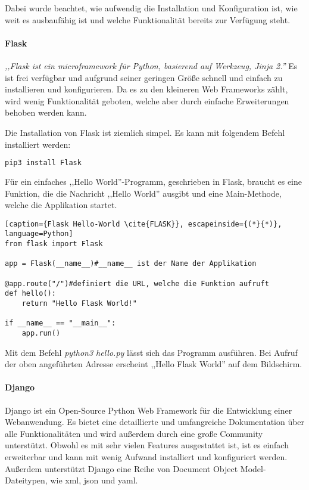 Dabei wurde beachtet, wie aufwendig die Installation und Konfiguration ist, wie weit es ausbaufähig ist und welche Funktionalität bereits zur Verfügung steht.

\paragraph{Flask}
\textit{,,Flask ist ein microframework für Python, basierend auf Werkzeug, Jinja 2.''}\cite{FLASK} Es ist frei verfügbar und aufgrund seiner geringen Größe schnell und einfach zu installieren und konfigurieren. Da es zu den kleineren Web Frameworks zählt, wird wenig Funktionalität geboten, welche aber durch einfache Erweiterungen behoben werden kann.\cite{FLASK}

Die Installation von Flask ist ziemlich simpel. Es kann mit folgendem Befehl installiert werden:
\begin{lstlisting}[caption={Installation von Flask \cite{FLASK}}, language=bash]
pip3 install Flask
\end{lstlisting}

Für ein einfaches ,,Hello World''-Programm, geschrieben in Flask, braucht es eine Funktion, die die Nachricht ,,Hello World'' ausgibt und eine Main-Methode, welche die Applikation startet.

\begin{lstlisting}[caption={Flask Hello-World \cite{FLASK}}, escapeinside={(*}{*)}, language=Python]
from flask import Flask

app = Flask(__name__)#__name__ ist der Name der Applikation

@app.route("/")#definiert die URL, welche die Funktion aufruft
def hello():
	return "Hello Flask World!"

if __name__ == "__main__":
    app.run()
\end{lstlisting}

Mit dem Befehl \textit{python3 hello.py} lässt sich das Programm ausführen. Bei Aufruf der oben angeführten Adresse erscheint ,,Hello Flask World'' auf dem Bildschirm.

\paragraph{Django}
Django ist ein Open-Source Python Web Framework für die Entwicklung einer Webanwendung. Es bietet eine detaillierte und umfangreiche Dokumentation über alle Funktionalitäten und wird außerdem durch eine große Community unterstützt. Obwohl es mit sehr vielen Features ausgestattet ist, ist es einfach erweiterbar und kann mit wenig Aufwand installiert und konfiguriert werden. Außerdem unterstützt Django eine Reihe von Document Object Model-Dateitypen, wie xml, json und yaml. \cite{DJANGO}

